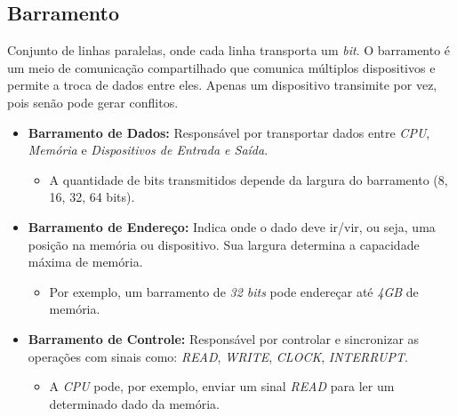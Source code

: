 \documentclass{article}
\begin{document}
\subsection{Barramento}
Conjunto de linhas paralelas, onde cada linha transporta um \emph{bit}. \newline
O barramento é um meio de comunicação compartilhado que comunica múltiplos dispositivos e permite a troca de dados entre eles. Apenas um dispositivo transimite por vez, pois senão pode gerar conflitos.
\begin{itemize}
    \item \textbf{Barramento de Dados:} Responsável por transportar dados entre \emph{CPU}, \emph{Memória} e \emph{Dispositivos de Entrada e Saída}.
    \begin{itemize}
        \item A quantidade de bits transmitidos depende da largura do barramento (8, 16, 32, 64 bits).
    \end{itemize}
    
\item \textbf{Barramento de Endereço:} Indica onde o dado deve ir/vir, ou seja, uma posição na memória ou dispositivo. Sua largura determina a capacidade máxima de memória.
    \begin{itemize}
        \item Por exemplo, um barramento de \emph{32 bits} pode endereçar até \emph{4GB} de memória.
    \end{itemize}

    \item \textbf{Barramento de Controle:} Responsável por controlar e sincronizar as operações com sinais como: \emph{READ}, \emph{WRITE}, \emph{CLOCK}, \emph{INTERRUPT}.
    \begin{itemize}
        \item A \emph{CPU} pode, por exemplo, enviar um sinal \emph{READ} para ler um determinado dado da memória.
    \end{itemize}
\end{itemize}
\end{document}

